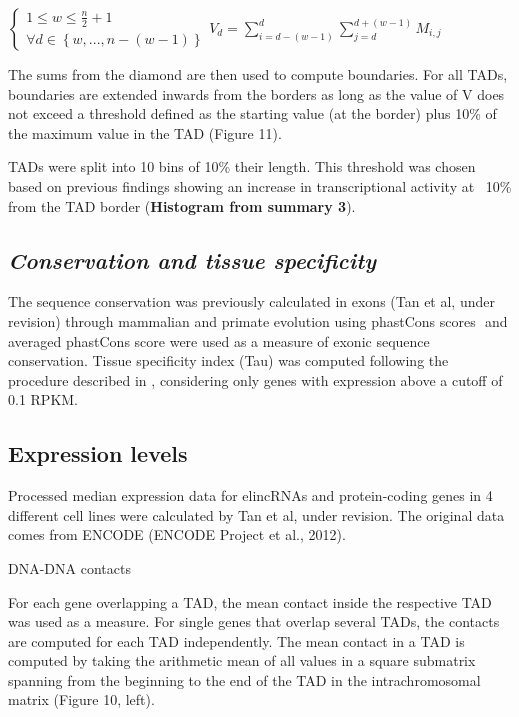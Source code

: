 \documentclass[11pt,a4paper]{report}
\begin{document}
$\left\{\begin{matrix}1\leq w\leq \frac{n}{2}+1 \\ \forall d\in\left \{ w , ... , n-\left ( w-1 \right ) \right \}\end{matrix}\right. V_{d}=\sum_{i=d-(w-1)}^{d}\sum_{j=d}^{d+(w-1)}M_{i,j}$

The sums from the diamond are then used to compute boundaries. For all TADs, boundaries are extended inwards from the borders as long as the value of V does not exceed a threshold defined as the starting value (at the border) plus 10\% of the maximum value in the TAD (Figure 11).

TADs were split into 10 bins of 10\% their length. This threshold was chosen based on previous findings showing an increase in transcriptional activity at ~10\% from the TAD border (\textbf{Histogram from summary 3}).

\subsection*{\textit{Conservation and tissue specificity}}

The sequence conservation was previously calculated in exons (Tan et al, under revision) through mammalian and primate evolution using phastCons scores \cite{Siepel2005}⁠ and averaged phastCons score were used as a measure of exonic sequence conservation. Tissue specificity index (Tau) was computed following the procedure described in \cite{Kryuchkova2015}, considering only genes with expression above a cutoff of 0.1 RPKM.

\subsection*{Expression levels}

Processed median expression data for elincRNAs and protein-coding genes in 4  different cell lines were calculated by Tan et al, under revision. The original data comes from ENCODE (ENCODE Project et al., 2012)⁠.

DNA-DNA contacts

For each gene overlapping a TAD, the mean contact inside the respective TAD was used as a measure. For single genes that overlap several TADs, the contacts are computed for each TAD independently. The mean contact in a TAD is computed by taking the arithmetic mean of all values in a square submatrix spanning from the beginning to the end of the TAD in the intrachromosomal matrix (Figure 10, left).
\end{document}
